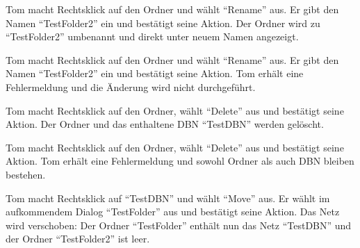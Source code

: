 \documentclass[parskip=full,11pt,twoside]{scrartcl}
\begin{document}












{Tom macht Rechtsklick auf den Ordner und wählt \enquote{Rename} aus. Er gibt den Namen \enquote{TestFolder2} ein und bestätigt seine Aktion.}
{Der Ordner wird zu \enquote{TestFolder2} umbenannt und direkt unter neuem Namen angezeigt.}

{Tom macht Rechtsklick auf den Ordner und wählt \enquote{Rename} aus. Er gibt den Namen \enquote{TestFolder2} ein und bestätigt seine Aktion.}
{Tom erhält eine Fehlermeldung und die Änderung wird nicht durchgeführt.}

{Tom macht Rechtsklick auf den Ordner, wählt \enquote{Delete} aus und bestätigt seine Aktion.}
{Der Ordner und das enthaltene DBN \enquote{TestDBN} werden gelöscht.}

{Tom macht Rechtsklick auf den Ordner, wählt \enquote{Delete} aus und bestätigt seine Aktion.}
{Tom erhält eine Fehlermeldung und sowohl Ordner als auch DBN bleiben bestehen.}

{Tom macht Rechtsklick auf \enquote{TestDBN} und wählt \enquote{Move} aus. Er wählt im aufkommendem Dialog \enquote{TestFolder} aus und bestätigt seine Aktion.}
{Das Netz wird verschoben: Der Ordner \enquote{TestFolder} enthält nun das Netz \enquote{TestDBN} und der Ordner \enquote{TestFolder2} ist leer.}
\end{document}
